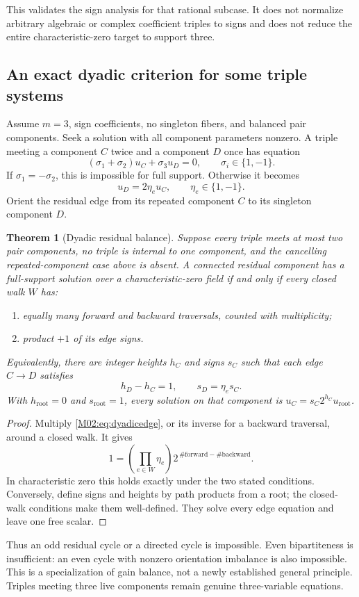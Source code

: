 \documentclass[11pt,a4paper,oneside]{report}
\newtheorem{theorem}{Theorem}[section]
\theoremstyle{definition}
\theoremstyle{remark}
\begin{document}
This validates the sign analysis for that rational subcase. It does not normalize arbitrary algebraic or complex coefficient triples to signs and does not reduce the entire characteristic-zero target to support three.

\subsection{An exact dyadic criterion for some triple systems}
Assume \(m=3\), sign coefficients, no singleton fibers, and balanced pair components. Seek a solution with all component parameters nonzero. A triple meeting a component \(C\) twice and a component \(D\) once has equation
\[
(\sigma_1+\sigma_2)u_C+\sigma_3u_D=0,\qquad
\sigma_i\in\{1,-1\}.
\]
If \(\sigma_1=-\sigma_2\), this is impossible for full support. Otherwise it becomes
\begin{equation}\label{M02:eq:dyadicedge}
u_D=2\eta_eu_C,\qquad \eta_e\in\{1,-1\}.
\end{equation}
Orient the residual edge from its repeated component \(C\) to its singleton component \(D\).
\begin{theorem}[Dyadic residual balance]\label{M02:thm:dyadic}
Suppose every triple meets at most two pair components, no triple is internal to one component, and the cancelling repeated-component case above is absent. A connected residual component has a full-support solution over a characteristic-zero field if and only if every closed walk \(W\) has:
\begin{enumerate}
\item equally many forward and backward traversals, counted with multiplicity;
\item product \(+1\) of its edge signs.
\end{enumerate}
Equivalently, there are integer heights \(h_C\) and signs \(s_C\) such that each edge \(C\to D\) satisfies
\[
h_D-h_C=1,\qquad s_D=\eta_es_C.
\]
With \(h_{\mathrm{root}}=0\) and \(s_{\mathrm{root}}=1\), every solution on that component is \(u_C=s_C2^{h_C}u_{\mathrm{root}}\).
\end{theorem}
\begin{proof}
Multiply \eqref{M02:eq:dyadicedge}, or its inverse for a backward traversal, around a closed walk. It gives
\[
1=\left(\prod_{e\in W}\eta_e\right)2^{\,\#\mathrm{forward}-\#\mathrm{backward}}.
\]
In characteristic zero this holds exactly under the two stated conditions. Conversely, define signs and heights by path products from a root; the closed-walk conditions make them well-defined. They solve every edge equation and leave one free scalar.
\end{proof}
Thus an odd residual cycle or a directed cycle is impossible. Even bipartiteness is insufficient: an even cycle with nonzero orientation imbalance is also impossible. This is a specialization of gain balance, not a newly established general principle. Triples meeting three live components remain genuine three-variable equations.
\end{document}
